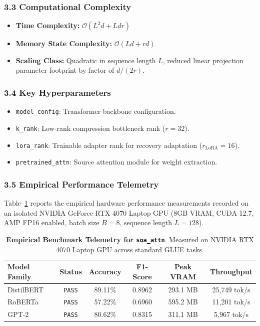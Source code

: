 \subsubsection*{3.3 Computational Complexity}
\begin{itemize}
    \item \textbf{Time Complexity:} $\mathcal{O}(L^2 d + L d r)$
    \item \textbf{Memory State Complexity:} $\mathcal{O}(L d + r d)$
    \item \textbf{Scaling Class:} Quadratic in sequence length $L$, reduced linear projection parameter footprint by factor of $d / (2r)$.
\end{itemize}

\subsubsection*{3.4 Key Hyperparameters}
\begin{itemize}
    \item \texttt{model\_config}: Transformer backbone configuration.
    \item \texttt{k\_rank}: Low-rank compression bottleneck rank ($r=32$).
    \item \texttt{lora\_rank}: Trainable adapter rank for recovery adaptation ($r_{\text{LoRA}}=16$).
    \item \texttt{pretrained\_attn}: Source attention module for weight extraction.
\end{itemize}

\subsubsection*{3.5 Empirical Performance Telemetry}
Table~\ref{tab:telemetry_soa_attn} reports the empirical hardware performance measurements recorded on an isolated NVIDIA GeForce RTX 4070 Laptop GPU (8GB VRAM, CUDA 12.7, AMP FP16 enabled, batch size $B=8$, sequence length $L=128$).

\begin{table}[h]
\centering
\small
\caption{\textbf{Empirical Benchmark Telemetry for \texttt{soa\_attn}}. Measured on NVIDIA RTX 4070 Laptop GPU across standard GLUE tasks.}
\label{tab:telemetry_soa_attn}
\begin{tabular*}{\columnwidth}{@{\extracolsep{\fill}}lccccc}
\toprule
\textbf{Model Family} & \textbf{Status} & \textbf{Accuracy} & \textbf{F1-Score} & \textbf{Peak VRAM} & \textbf{Throughput} \\
\midrule
DistilBERT & \texttt{PASS} & 89.11\% & 0.8962 & 293.1 MB & 25,749 tok/s \\
RoBERTa & \texttt{PASS} & 57.22\% & 0.6960 & 595.2 MB & 11,201 tok/s \\
GPT-2 & \texttt{PASS} & 80.62\% & 0.8315 & 311.1 MB & 5,967 tok/s \\
\bottomrule
\end{tabular*}
\end{table}

